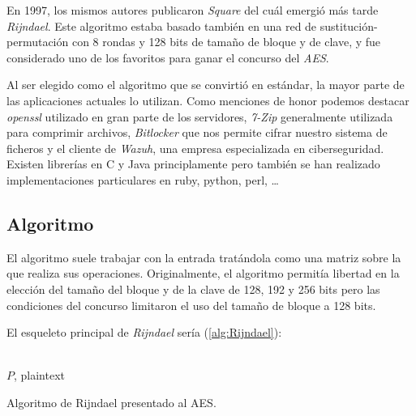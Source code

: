 En 1997, los mismos autores publicaron \textit{Square} \cite{Square_Official} del cuál emergió más tarde \textit{Rijndael}. Este algoritmo estaba basado también en una red de sustitución-permutación con 8 rondas y 128 bits de tamaño de bloque y de clave, y fue considerado uno de los favoritos para ganar el concurso del \textit{AES}\cite{Square_Wiki}.

Al ser elegido como el algoritmo que se convirtió en estándar, la mayor parte de las aplicaciones actuales lo utilizan.
Como menciones de honor podemos destacar \textit{openssl} utilizado en gran parte de los servidores, \textit{7-Zip} generalmente utilizada para comprimir archivos, \textit{Bitlocker} que nos permite cifrar nuestro sistema de ficheros y el cliente de \textit{Wazuh}, una empresa especializada en ciberseguridad.
Existen librerías en C\cite{Crypto} y Java principlamente pero también se han realizado implementaciones particulares en ruby, python, perl, \dots\cite{Implementations}

\subsection{Algoritmo}
El algoritmo suele trabajar con la entrada tratándola como una matriz sobre la que realiza sus operaciones. Originalmente, el algoritmo permitía libertad en la elección del tamaño del bloque y de la clave de 128, 192 y 256 bits pero las condiciones del concurso limitaron el uso del tamaño de bloque a 128 bits.

El esqueleto principal de \textit{Rijndael} sería (\ref{alg:Rijndael})\cite{Rijndael_specs}\cite{Rijndael_AES}:
\begin{algorithm}[H]
	\begin{algorithmic}[1]
		\REQUIRE \ \\
			\texttt{$P$}, plaintext\\
			
			\ENDIF
		\ENDFOR
	\end{algorithmic}
	\caption{Algoritmo de Rijndael presentado al AES.}
		\label{alg:Rijndael}
\end{algorithm}

